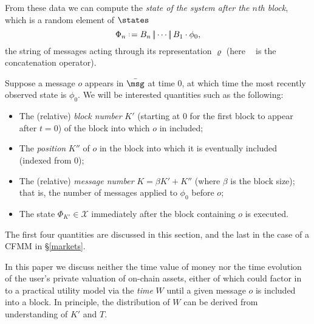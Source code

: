 \documentclass[a4paper,11pt]{article}
\newcommand \cat {\mathop{|\!|}}
\begin{document}
From these data we can compute the \emph{state of the system after the $n$th block}, which is a random element of $\states$
\[
  \Phi_n \defeq B_n \cat\cdots\cat B_1 \cdot\phi_0,
\]
the string of messages acting through its representation $\varrho$ (here $\cat$ is the concatenation operator).

Suppose a message $o$ appears in $\bar\msg$ at time $0$, at which time the most recently observed state is $\phi_0$.
%
We will be interested quantities such as the following:
\begin{itemize}
  \item The (relative) \emph{block number} $K'$ (starting at $0$ for the first block to appear after $t=0$) of the block into which $o$ in included;
  \item The \emph{position} $K''$ of $o$ in the block into which it is eventually included (indexed from $0$);
  \item The (relative) \emph{message number} $K = \beta K' + K''$ (where $\beta$ is the block size); that is, the number of messages applied to $\phi_0$ before $o$;
  \item The state $\Phi_{K'}\in\mathcal{X}$ immediately after the block containing $o$ is executed.
\end{itemize}
The first four quantities are discussed in this section, and the last in the case of a CFMM in \S\ref{markets}.


\begin{remark}

  In this paper we discuss neither the time value of money nor the time evolution of the user's private valuation of on-chain assets, either of which could factor in to a practical utility model via the \emph{time} $W$ until a given message $o$ is included into a block.
  In principle, the distribution of $W$ can be derived from understanding of $K'$ and $T$.

\end{remark}
\end{document}
